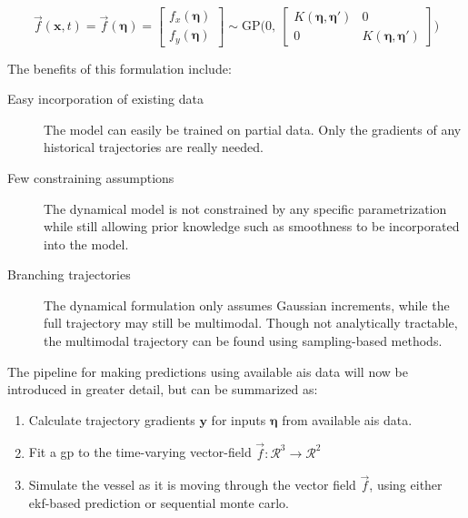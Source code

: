 \begin{equation}\label{eq:gp_vec_field}
\vec{f}(\boldsymbol{x}, t) = \vec{f}(\boldsymbol{\eta}) = \begin{bmatrix} f_x (\boldsymbol{\eta})\\ f_y (\boldsymbol{\eta})\end{bmatrix} \sim \text{GP} \big(0, \ \begin{bmatrix}
    K(\boldsymbol{\eta}, \boldsymbol{\eta}') & 0 \\ 0 & K(\boldsymbol{\eta}, \boldsymbol{\eta}')
\end{bmatrix}\big)
\end{equation}

The benefits of this formulation include:
\begin{description}
    \item[Easy incorporation of existing data] The model can easily be trained on partial data. Only the gradients of any historical trajectories are really needed.
    \item[Few constraining assumptions] The dynamical model is not constrained by any specific parametrization while still allowing prior knowledge such as smoothness to be incorporated into the model.
    \item[Branching trajectories] The dynamical formulation only assumes Gaussian increments, while the full trajectory may still be multimodal. Though not analytically tractable, the multimodal trajectory can be found using sampling-based methods.
\end{description}

The pipeline for making predictions using available \acrshort{ais} data will now be introduced in greater detail, but can be summarized as:
\begin{enumerate}
    \item Calculate trajectory gradients $\boldsymbol{y}$ for inputs $\boldsymbol{\eta}$ from available \acrshort{ais} data.
    \item Fit a \acrshort{gp} to the time-varying vector-field $\vec{f}: \mathcal{R}^3 \to \mathcal{R}^2$
    \item Simulate the vessel as it is moving through the vector field $\vec{f}$, using either \acrshort{ekf}-based prediction or sequential monte carlo.
\end{enumerate}

